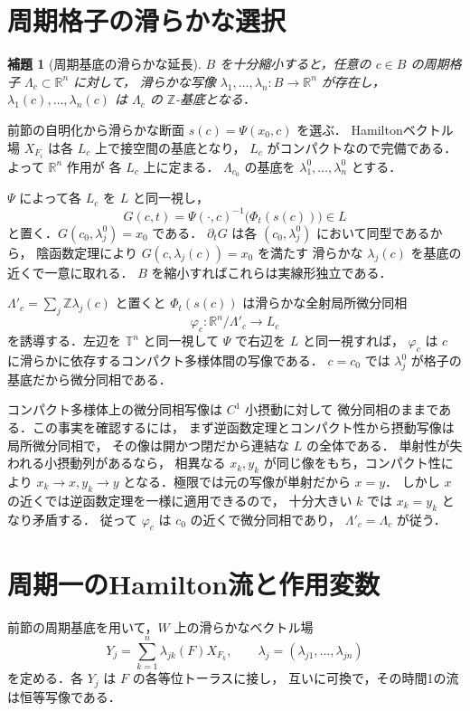 \documentclass[a5paper,10pt,onecolumn]{jsarticle}
\makeatletter
\theoremstyle{mathnotetheorem}
\newtheorem{lemma}[theorem]{補題}
\renewcommand{\proofname}{証明}
\renewenvironment{proof}[1][\proofname]{%
  \par\pushQED{\qed}\normalfont\topsep4\p@\@plus2\p@\relax
  \trivlist\item[\hskip\labelsep\bfseries #1]\ignorespaces
}{\popQED\endtrivlist\@endpefalse}
\makeatother
\begin{document}
\section{周期格子の滑らかな選択}
\begin{lemma}[周期基底の滑らかな延長]
$B$ を十分縮小すると，任意の $c\in B$ の周期格子
$\Lambda_c\subset\mathbb R^n$ に対して，
滑らかな写像 $\lambda_1,\ldots,\lambda_n:B\to\mathbb R^n$ が存在し，
$\lambda_1(c),\ldots,\lambda_n(c)$ は $\Lambda_c$ の
$\mathbb Z$-基底となる．
\end{lemma}
\begin{proof}
前節の自明化から滑らかな断面 $s(c)=\Psi(x_0,c)$ を選ぶ．
Hamiltonベクトル場 $X_{F_i}$ は各 $L_c$ 上で接空間の基底となり，
$L_c$ がコンパクトなので完備である．よって $\mathbb R^n$ 作用が
各 $L_c$ 上に定まる．
$\Lambda_{c_0}$ の基底を
$\lambda_1^0,\ldots,\lambda_n^0$ とする．

$\Psi$ によって各 $L_c$ を $L$ と同一視し，
\[
 G(c,t)=\Psi(\cdot,c)^{-1}\bigl(\Phi_t(s(c))\bigr)\in L
\]
と置く．$G(c_0,\lambda_j^0)=x_0$ である．
$\partial_tG$ は各 $(c_0,\lambda_j^0)$ において同型であるから，
陰函数定理により $G(c,\lambda_j(c))=x_0$ を満たす
滑らかな $\lambda_j(c)$ を基底の近くで一意に取れる．
$B$ を縮小すればこれらは実線形独立である．

$\Lambda'_c=\sum_j\mathbb Z\lambda_j(c)$ と置くと
$\Phi_t(s(c))$ は滑らかな全射局所微分同相
\[
   \varphi_c:\mathbb R^n/\Lambda'_c\longrightarrow L_c
\]
を誘導する．左辺を $\mathbb T^n$ と同一視して
$\Psi$ で右辺を $L$ と同一視すれば，
$\varphi_c$ は $c$ に滑らかに依存するコンパクト多様体間の写像である．
$c=c_0$ では $\lambda_j^0$ が格子の基底だから微分同相である．

コンパクト多様体上の微分同相写像は $C^1$ 小摂動に対して
微分同相のままである．この事実を確認するには，
まず逆函数定理とコンパクト性から摂動写像は局所微分同相で，
その像は開かつ閉だから連結な $L$ の全体である．
単射性が失われる小摂動列があるなら，
相異なる $x_k,y_k$ が同じ像をもち，コンパクト性により
$x_k\to x,y_k\to y$ となる．極限では元の写像が単射だから $x=y$．
しかし $x$ の近くでは逆函数定理を一様に適用できるので，
十分大きい $k$ では $x_k=y_k$ となり矛盾する．
従って $\varphi_c$ は $c_0$ の近くで微分同相であり，
$\Lambda'_c=\Lambda_c$ が従う．
\end{proof}

\section{周期一のHamilton流と作用変数}
前節の周期基底を用いて，$W$ 上の滑らかなベクトル場
\[
 Y_j=\sum_{k=1}^n\lambda_{jk}(F)X_{F_k},
 \qquad\lambda_j=(\lambda_{j1},\ldots,\lambda_{jn})
\]
を定める．各 $Y_j$ は $F$ の各等位トーラスに接し，
互いに可換で，その時間1の流は恒等写像である．
\end{document}
